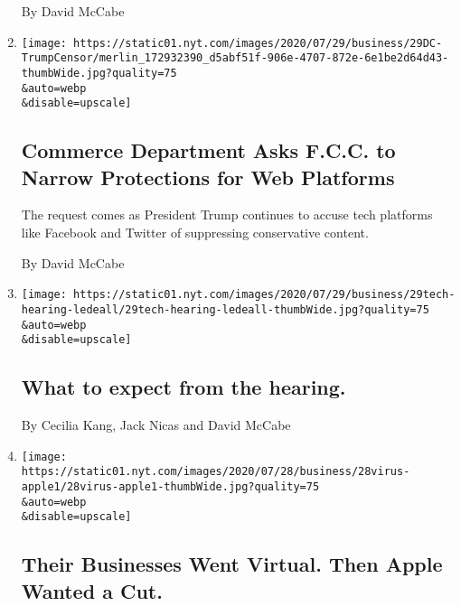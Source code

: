 \begin{enumerate}
  By David McCabe
\item
  \href{/2020/07/29/technology/trump-fcc-twitter-facebook.html}{}

  \texttt{[image: https://static01.nyt.com/images/2020/07/29/business/29DC-TrumpCensor/merlin\_172932390\_d5abf51f-906e-4707-872e-6e1be2d64d43-thumbWide.jpg?quality=75\\\&auto=webp\\\&disable=upscale]}

  \hypertarget{commerce-department-asks-fcc-to-narrow-protections-for-web-platforms}{%
  \subsection{Commerce Department Asks F.C.C. to Narrow Protections for
  Web
  Platforms}\label{commerce-department-asks-fcc-to-narrow-protections-for-web-platforms}}

  The request comes as President Trump continues to accuse tech
  platforms like Facebook and Twitter of suppressing conservative
  content.

  By David McCabe
\item
  \href{/live/2020/07/29/technology/tech-ceos-hearing-testimony/what-to-expect-from-the-hearing}{}

  \texttt{[image: https://static01.nyt.com/images/2020/07/29/business/29tech-hearing-ledeall/29tech-hearing-ledeall-thumbWide.jpg?quality=75\\\&auto=webp\\\&disable=upscale]}

  \hypertarget{what-to-expect-from-the-hearing}{%
  \subsection{What to expect from the
  hearing.}\label{what-to-expect-from-the-hearing}}

  By Cecilia Kang, Jack Nicas and David McCabe
\item
  \href{/2020/07/28/technology/apple-app-store-airbnb-classpass.html}{}

  \texttt{[image: https://static01.nyt.com/images/2020/07/28/business/28virus-apple1/28virus-apple1-thumbWide.jpg?quality=75\\\&auto=webp\\\&disable=upscale]}

  \hypertarget{their-businesses-went-virtual-then-apple-wanted-a-cut}{%
  \subsection{Their Businesses Went Virtual. Then Apple Wanted a
  Cut.}\label{their-businesses-went-virtual-then-apple-wanted-a-cut}}


\end{enumerate}
